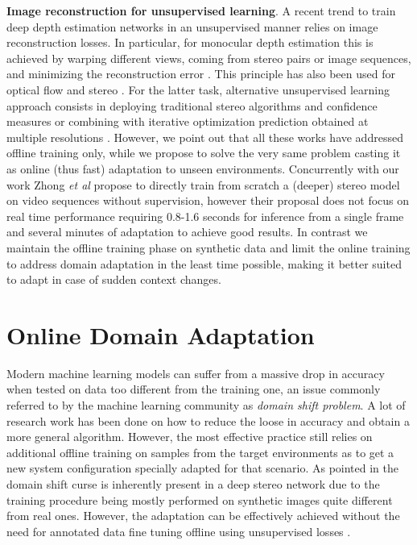\documentclass[10pt,twocolumn,letterpaper]{article}
\def\etal{\emph{et al}}
\begin{document}
\textbf{Image reconstruction for unsupervised learning}.
A recent trend to train deep depth estimation networks in an unsupervised manner relies on image reconstruction losses. In particular, for monocular depth estimation this is achieved by warping different views, coming from stereo pairs or image sequences, and minimizing the reconstruction error \cite{garg2016unsupervised,zhou2017unsupervised,godard2017unsupervised,zhang2018activestereonet,pydnet18,3net18}. This principle has also been used for optical flow \cite{Meister:2018:UUL} and stereo \cite{zhou2017unsupervisedStereo}. For the latter task, alternative unsupervised learning approach consists in deploying traditional stereo algorithms and confidence measures \cite{Tonioni_2017_ICCV} or combining with iterative optimization prediction obtained at multiple resolutions \cite{pang2018zoom}. However, we point out that all these works have addressed offline training only, while we propose to solve the very same problem casting it as online (thus fast) adaptation to unseen environments. 
Concurrently with our work Zhong \etal{} \cite{zhong2018open} propose to directly train from scratch a (deeper) stereo model on video sequences without supervision, however their proposal does not focus on real time performance requiring 0.8-1.6 seconds for inference from a single frame and several minutes of adaptation to achieve good results. In contrast we maintain the offline training phase on synthetic data and limit the online training to address domain adaptation in the least time possible, making it better suited to adapt in case of sudden context changes.

\section{Online Domain Adaptation}
\label{sec:online}

Modern machine learning models can suffer from a massive drop in accuracy when tested on data too different from the training one, an issue commonly referred to by the machine learning community as \emph{domain shift problem}. A lot of research work has been done on how to reduce the loose in accuracy and obtain a more general algorithm. However, the most effective practice still relies on additional offline training on samples from the target environments as to get a new system configuration specially adapted for that scenario.  
As pointed in \cite{Tonioni_2017_ICCV} the domain shift curse is inherently present in a deep stereo network due to the training procedure being mostly performed on synthetic images quite different from real ones. However, the adaptation can be effectively achieved without the need for annotated data fine tuning offline using unsupervised losses \cite{garg2016unsupervised,godard2017unsupervised,Tonioni_2017_ICCV,zhang2018activestereonet}. 
\end{document}
